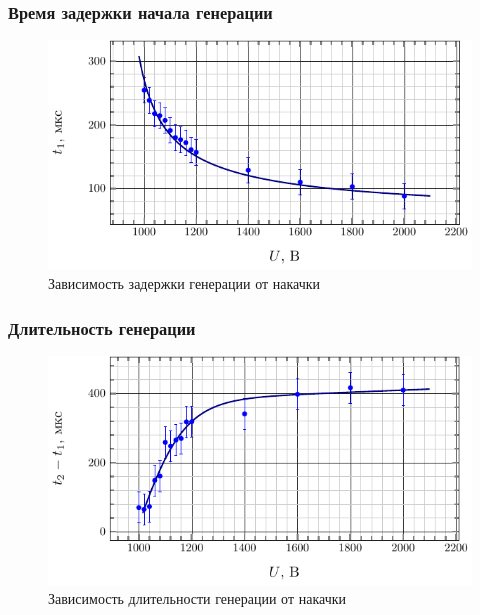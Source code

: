 \documentclass[a4paper,14pt]{extarticle}
\begin{document}
\subsubsection{Время задержки начала генерации}
\begin{figure}[H]
  \centering
  \includegraphics[scale=1.5]{fig/t1_from_u.pdf}
  \caption{Зависимость задержки генерации от накачки}
  \label{fig:figure1}
\end{figure}


\subsubsection{Длительность генерации}
\begin{figure}[H]
  \centering
  \includegraphics[scale=1.5]{fig/tau_from_u.pdf}
  \caption{Зависимость длительности генерации от накачки}
  \label{fig:figure1}
\end{figure}
\end{document}
